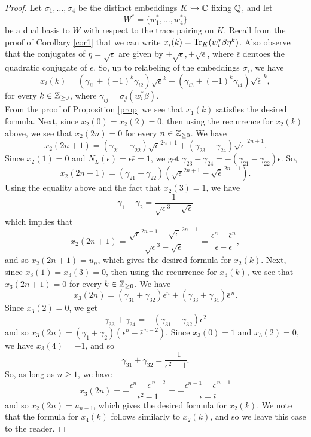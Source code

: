 \documentclass[11pt]{amsart}
\begin{document}
\begin{cor}
\begin{proof}
Let $\sigma_1, \dots, \sigma_4$ be the distinct embeddings $K \hookrightarrow \mathbb{C}$ fixing $\mathbb{Q}$, and let 
\[W^*=\{w_1^*, \dots, w_4^*\}\]
be a dual basis to $W$ with respect to the trace pairing on $K$. Recall from the proof of Corollary \ref{cor1} that we can write $x_i(k)=\operatorname{Tr}_K(w_i^* \beta \eta^k)$. Also observe that the conjugates of $\eta=\sqrt{\epsilon}$ are given by $\pm \sqrt{\epsilon}, \pm \sqrt{\bar{\epsilon}}$, where $\bar{\epsilon}$ dentoes the quadratic conjugate of $\epsilon$. So, up to relabeling of the embeddings $\sigma_i$, we have
\[x_i(k)=(\gamma_{i1} +(-1)^k\gamma_{i2}) \sqrt{\epsilon}^k+(\gamma_{i3}+(-1)^k\gamma_{i4}) \sqrt{\bar{\epsilon}}^{\,k},\]
for every $k \in \mathbb{Z}_{\geq 0}$, where $\gamma_{ij}=\sigma_j(w_i^*\beta)$. \\

From the proof of Proposition \ref{prop} we see that $x_1(k)$ satisfies the desired formula. Next, since $x_2(0)=x_2(2)=0$, then using the recurrence for $x_2(k)$ above, we see that $x_2(2n)=0$ for every $n \in \mathbb{Z}_{\geq 0}$. We have
\[x_2(2n+1)=(\gamma_{21}-\gamma_{22})\sqrt{\epsilon}^{2n+1}+(\gamma_{23}-\gamma_{24})\sqrt{\bar{\epsilon}}^{\, 2n+1}.\]
Since $x_2(1)=0$ and $N_L(\epsilon)=\epsilon \bar{\epsilon}=1$, we get
$\gamma_{23}-\gamma_{24}= -(\gamma_{21}-\gamma_{22}) \epsilon$. So,
\[x_2(2n+1)=(\gamma_{21} - \gamma_{22}) \left(\sqrt{\epsilon}^{2n+1} - \sqrt{\bar{\epsilon}}^{\, 2n-1}\right).\]
Using the equality above and the fact that $x_2(3)=1$, we have
\[\gamma_1-\gamma_2=\dfrac{1}{\sqrt{\epsilon}^3-\sqrt{\bar{\epsilon}}}\]
which implies that
\[x_2(2n+1)	=\frac{\sqrt{\epsilon}^{2n+1} - \sqrt{\bar{\epsilon}}^{\, 2n-1}}{\sqrt{\epsilon}^3-\sqrt{\bar{\epsilon}}}= \frac{\epsilon^n-\bar{\epsilon}^n}{\epsilon-\bar{\epsilon}},\]
and so $x_2(2n+1)=u_n$, which gives the desired formula for $x_2(k)$. Next, since $x_3(1)=x_3(3)=0$, then using the recurrence for $x_3(k)$, we see that $x_3(2n+1)=0$ for every $k \in \mathbb{Z}_{\geq 0}$. We have
\[x_3(2n)=(\gamma_{31}+\gamma_{32}) \epsilon^n + (\gamma_{33}+\gamma_{34}) \bar{\epsilon}^{\, n}.\]
Since $x_3(2)=0$, we get
\[\gamma_{33}+\gamma_{34}=-(\gamma_{31}-\gamma_{32}) \epsilon^2\]
and so
$x_3(2n)=(\gamma_1+\gamma_2)(\epsilon^n - \bar{\epsilon}^{\,n-2}).$
Since $x_3(0)=1$ and $x_3(2)=0$, we have $x_3(4)=-1$, and so
\[\gamma_{31}+\gamma_{32}=\frac{-1}{\epsilon^2-1}.\]
So, as long as $n \geq 1$, we have
\[x_3(2n)=- \frac{\epsilon^n-\bar{\epsilon}^{\, n-2}}{\epsilon^2-1}=- \frac{\epsilon^{n-1} - \bar{\epsilon}^{\, n-1}}{\epsilon-\bar{\epsilon}}\]
and so $x_2(2n)=u_{n-1}$, which gives the desired formula for $x_2(k)$. We note that the formula for $x_4(k)$ follows similarly to $x_2(k)$, and so we leave this case to the reader.
\end{proof}
\end{cor}
\end{document}
